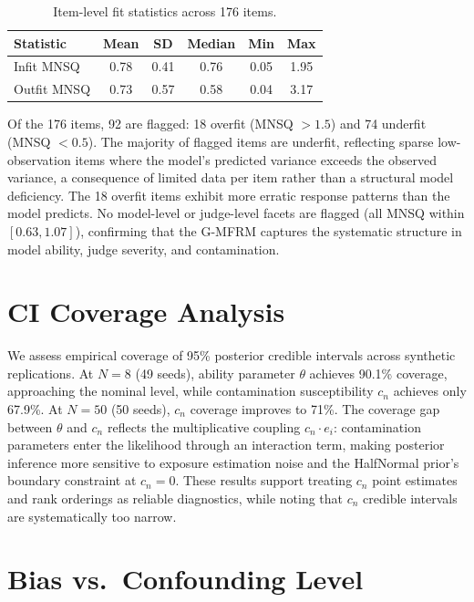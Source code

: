\begin{table}[h]
\centering
\small
\begin{tabular}{lccccc}
\toprule
\textbf{Statistic} & \textbf{Mean} & \textbf{SD} & \textbf{Median} & \textbf{Min} & \textbf{Max} \\
\midrule
Infit MNSQ & 0.78 & 0.41 & 0.76 & 0.05 & 1.95 \\
Outfit MNSQ & 0.73 & 0.57 & 0.58 & 0.04 & 3.17 \\
\bottomrule
\end{tabular}
\caption{Item-level fit statistics across 176 items.}
\label{tab:item_fit_summary}
\end{table}

Of the 176 items, 92 are flagged: 18 overfit (MNSQ $> 1.5$) and 74 underfit (MNSQ $< 0.5$). The majority of flagged items are underfit, reflecting sparse low-observation items where the model's predicted variance exceeds the observed variance, a consequence of limited data per item rather than a structural model deficiency. The 18 overfit items exhibit more erratic response patterns than the model predicts. No model-level or judge-level facets are flagged (all MNSQ within $[0.63, 1.07]$), confirming that the G-MFRM captures the systematic structure in model ability, judge severity, and contamination.


\section{CI Coverage Analysis}
\label{app:ci_coverage}

We assess empirical coverage of 95\% posterior credible intervals across synthetic replications. At $N=8$ (49 seeds), ability parameter $\theta$ achieves 90.1\% coverage, approaching the nominal level, while contamination susceptibility $c_n$ achieves only 67.9\%. At $N=50$ (50 seeds), $c_n$ coverage improves to 71\%. The coverage gap between $\theta$ and $c_n$ reflects the multiplicative coupling $c_n \cdot e_i$: contamination parameters enter the likelihood through an interaction term, making posterior inference more sensitive to exposure estimation noise and the HalfNormal prior's boundary constraint at $c_n = 0$. These results support treating $c_n$ point estimates and rank orderings as reliable diagnostics, while noting that $c_n$ credible intervals are systematically too narrow.

\section{Bias vs.\ Confounding Level}
\label{app:bias_vs_rho}

